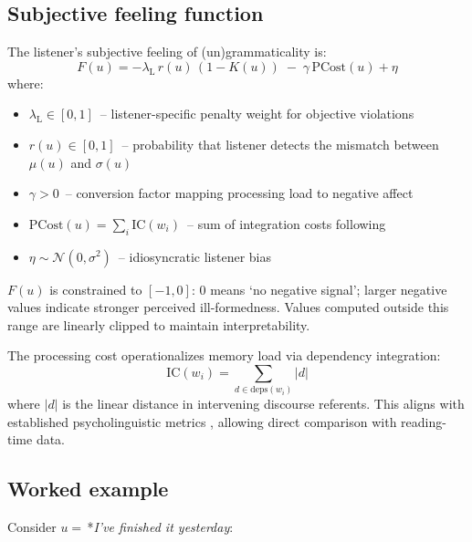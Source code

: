 \documentclass[12pt]{article}
\newcommand{\listener}{\mathrm{L}}
\begin{document}
\subsection{Subjective feeling function}

The listener's subjective feeling of (un)grammaticality is:
\begin{equation}\label{eq:F}
F(u)= -\lambda_{\listener}\,r(u)\,(1-K(u)) \;-\; \gamma\,\text{PCost}(u) + \eta
\end{equation}
where:
\begin{itemize}
  \item $\lambda_{\listener} \in [0,1]$~-- listener-specific penalty weight for objective violations
  \item $r(u) \in [0,1]$~-- probability that listener detects the mismatch between $\mu(u)$ and $\sigma(u)$
  \item $\gamma > 0$~-- conversion factor mapping processing load to negative affect
  \item $\text{PCost}(u) = \sum_{i} \text{IC}(w_i)$~-- sum of integration costs following \textcite{gibson2000}
  \item $\eta \sim \mathcal{N}(0,\sigma^{2})$~-- idiosyncratic listener bias
\end{itemize}

$F(u)$ is constrained to $[-1,0]$: 0 means `no negative signal'; larger negative values indicate stronger perceived ill-formedness. Values computed outside this range are linearly clipped to maintain interpretability.

The processing cost operationalizes memory load via dependency integration:
\begin{equation}
\text{IC}(w_i) = \sum_{d \in \text{deps}(w_i)} |d|
\end{equation}
where $|d|$ is the linear distance in intervening discourse referents. This aligns with established psycholinguistic metrics \parencite{futrell2020}, allowing direct comparison with reading-time data.

\subsection{Worked example}

Consider $u=$\,*\textit{I've finished it yesterday}:
\end{document}
